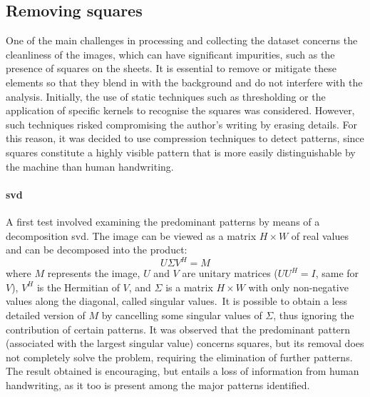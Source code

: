 \subsection{Removing squares}
    One of the main challenges in processing and collecting the dataset concerns the cleanliness of the images, which can have significant impurities, such as the presence of squares on the sheets. It is essential to remove or mitigate these elements so that they blend in with the background and do not interfere with the analysis. Initially, the use of static techniques such as thresholding or the application of specific kernels to recognise the squares was considered. However, such techniques risked compromising the author's writing by erasing details. For this reason, it was decided to use compression techniques to detect patterns, since squares constitute a highly visible pattern that is more easily distinguishable by the machine than human handwriting.

    \paragraph{\gls{svd}}
    A first test involved examining the predominant patterns by means of a decomposition \gls{svd}. The image can be viewed as a matrix $H \times W$ of real values and can be decomposed into the product:
    \[
    	U\Sigma V^H = M
    \]
    where $M$ represents the image, $U$ and $V$ are unitary matrices ($UU^H = I$, same for $V$), $V^H$ is the Hermitian of $V$, and $\Sigma$ is a matrix $H \times W$ with only non-negative values along the diagonal, called singular values.\
    It is possible to obtain a less detailed version of $M$ by cancelling some singular values of $\Sigma$, thus ignoring the contribution of certain patterns. It was observed that the predominant pattern (associated with the largest singular value) concerns squares, but its removal does not completely solve the problem, requiring the elimination of further patterns. The result obtained is encouraging, but entails a loss of information from human handwriting, as it too is present among the major patterns identified.

